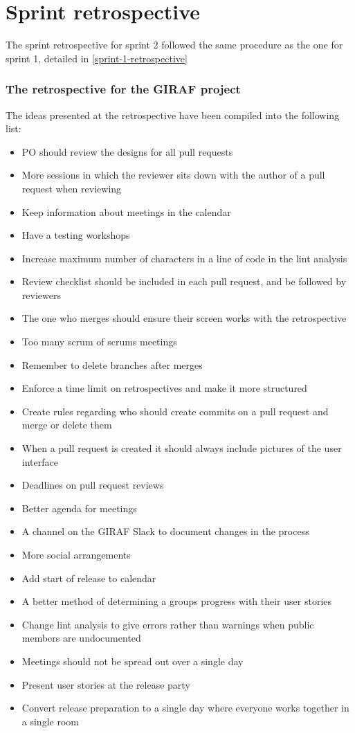\section{Sprint retrospective}
The sprint retrospective for sprint 2 followed the same procedure as the one for sprint 1, detailed in \autoref{sprint-1-retrospective}

\subsubsection{The retrospective for the GIRAF project}
The ideas presented at the retrospective have been compiled into the following list:
\begin{itemize}
    \item PO should review the designs for all pull requests
    \item More sessions in which the reviewer sits down with the author of a pull request when reviewing
    \item Keep information about meetings in the calendar
    \item Have a testing workshops
    \item Increase maximum number of characters in a line of code in the lint analysis
    \item Review checklist should be included in each pull request, and be followed by reviewers
    \item The one who merges should ensure their screen works with the retrospective
    \item Too many scrum of scrums meetings
    \item Remember to delete branches after merges
    \item Enforce a time limit on retrospectives and make it more structured
    \item Create rules regarding who should create commits on a pull request and merge or delete them
    \item When a pull request is created it should always include pictures of the user interface
    \item Deadlines on pull request reviews
    \item Better agenda for meetings
    \item A channel on the GIRAF Slack to document changes in the process
    \item More social arrangements
    \item Add start of release to calendar
    \item A better method of determining a groups progress with their user stories
    \item Change lint analysis to give errors rather than warnings when public members are undocumented
    \item Meetings should not be spread out over a single day
    \item Present user stories at the release party
    \item Convert release preparation to a single day where everyone works together in a single room
\end{itemize}
